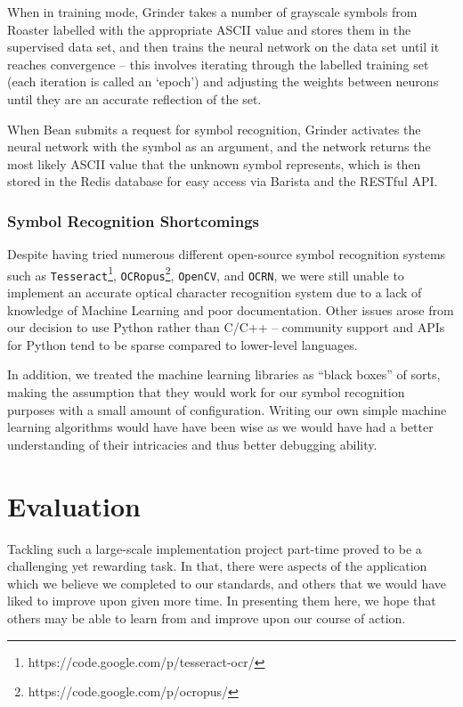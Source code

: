 \documentclass{acm_proc_article-sp}
\begin{document}
When in training mode, Grinder takes a number of grayscale symbols from Roaster labelled with the appropriate ASCII value and stores them in the supervised data set, and then trains the neural network on the data set until it reaches convergence -- this involves iterating through the labelled training set (each iteration is called an `epoch') and adjusting the weights between neurons until they are an accurate reflection of the set. 

When Bean submits a request for symbol recognition, Grinder activates the neural network with the symbol as an argument, and the network returns the most likely ASCII value that the unknown symbol represents, which is then stored in the Redis database for easy access via Barista and the RESTful API.

\subsubsection{Symbol Recognition Shortcomings}
Despite having tried numerous different open-source symbol recognition systems such as \texttt{Tesseract}\footnote{https://code.google.com/p/tesseract-ocr/}, \texttt{OCRopus}\footnote{https://code.google.com/p/ocropus/}, \texttt{OpenCV}, and \texttt{OCRN}, we were still unable to implement an accurate optical character recognition system due to a lack of knowledge of Machine Learning and poor documentation. Other issues arose from our decision to use Python rather than C/C++ -- community support and APIs for Python tend to be sparse compared to lower-level languages.

In addition, we treated the machine learning libraries as ``black boxes'' of sorts, making the assumption that they would work for our symbol recognition purposes with a small amount of configuration. Writing our own simple machine learning algorithms would have have been wise as we would have had a better understanding of their intricacies and thus better debugging ability.

\section{Evaluation}
Tackling such a large-scale implementation project part-time proved to be a challenging yet rewarding task. In that, there were aspects of the application which we believe we completed to our standards, and others that we would have liked to improve upon given more time. In presenting them here, we hope that others may be able to learn from and improve upon our course of action.
\end{document}
